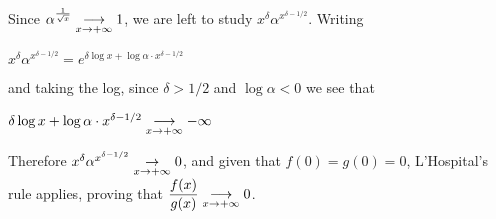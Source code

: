 \documentclass[11pt]{article}
\newcommand{\tf}[2]{#1/#2}
\newcommand{\centers}[2][2]{
    \begin{center}
    {#2}\end{center}}
\newcommand{\f}[2]{{
	\mathchoice%
		{\dfrac{#1}{#2}}
    	{\dfrac{#1}{#2}}
		{\frac{#1}{#2}}
		{\frac{#1}{#2}}
}}
\newcommand{\pinf}{\tiny{+}\infty}
\newcommand{\minf}{\tiny{-}\infty}
\begin{document}
Since $\alpha^{\f{1}{\sqrt{x}}} 
        \underset{x\rightarrow\pinf}{\longrightarrow} 1$, we are left to study 
        $ x^{\delta} \alpha^{x^{\delta-\tf12}}$. Writing

 

\centers{$x^{\delta} \alpha^{x^{\delta-\tf12}} 
            = e^{ \delta \log x + \log \alpha \cdot x^{\delta - \tf12} }$}

and taking the log, since $\delta > \tf12$ and $\log \alpha < 0$ we see that

\centers{$ \delta \log x + \log \alpha \cdot x^{\delta - \tf12} 
            \underset{x\rightarrow\pinf}{\longrightarrow} \minf$}

Therefore $x^{\delta} \alpha^{x^{\delta-\tf12}} \underset{x\rightarrow\pinf}{\rightarrow} 0$,
and given that $f(0) = g(0) = 0$, L'Hospital's rule applies, proving that 
$\f{f(x)}{g(x)} \underset{x\rightarrow\pinf}{\longrightarrow} 0$.
\end{document}
